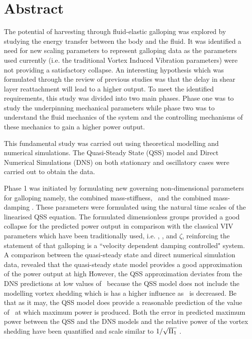 \chapter*{Abstract}

The potential of harvesting through fluid-elastic galloping was explored by studying the energy transfer between the body and the fluid. It was identified a need for new scaling parameters to represent galloping data as the parameters used currently (i.e. the traditional Vortex Induced Vibration parameters) were not providing a satisfactory collapse. An interesting hypothesis which was formulated through the review of previous studies was that the delay in shear layer reattachment will lead to a higher output. To meet the identified requirements, this study was divided into two main phases. Phase one was to study the underpinning mechanical parameters while phase two was to understand the fluid mechanics of the system and the controlling mechanisms of these mechanics to gain a higher power output. 

This fundamental study was carried out using theoretical modelling and numerical simulations. The Quasi-Steady State (QSS) model and Direct Numerical Simulations (DNS) on both stationary and oscillatory cases were carried out to obtain the data.


Phase 1 was initiated by formulating new governing non-dimensional parameters for galloping namely, the combined mass-stiffness, \massstiff\, and the combined mass-damping \massdamp. These parameters were formulated using the natural time scales of the linearised QSS equation. The formulated dimensionless groups provided a good collapse for the predicted power output in comparison with the classical VIV parameters which have been traditionally used, i.e. \ustar, \mstar, and $\zeta$, reinforcing the statement of \citet{Paidoussis2010} that galloping is a ``velocity dependent damping controlled" system. 
A comparison between the quasi-steady state and direct numerical simulation data, revealed that the quasi-steady state model provides a good approximation of the power output at high \massstiff\. However, the QSS approximation deviates from the DNS predictions at low values of \massstiff\ because the QSS model does not include the modelling vortex shedding which is has a higher influence as \massstiff\ is decreased. Be that as it may, the QSS model does provide a reasonable prediction of the value of \massdamp\ at which maximum power is produced. Both the error in predicted maximum power between the QSS and the DNS models and the relative power of the vortex shedding have been quantified and scale similar to $1/\sqrt{\Pi_1}$ .

